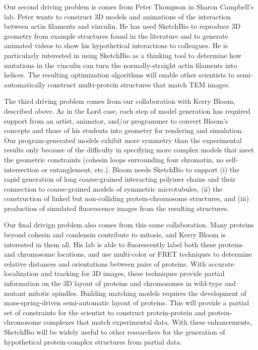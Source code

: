 \documentclass[twocolumn]{bmcart}%
\begin{document}
Our second driving problem is comes from Peter Thompson in Sharon Campbell's lab.  Peter wants to construct 3D models and animations of the interaction between actin filaments and vinculin.  He has used SketchBio to reproduce 3D geometry from example structures found in the literature and to generate animated videos to show his hypothetical interactions to colleagues.  He is particularly interested in using SketchBio as a thinking tool to determine how mutations in the vinculin can turn the normally-straight actin filaments into helices.  The resulting optimization algorithms will enable other scientists to semi-automatically construct multi-protein structures that match TEM images.

The third driving problem comes from our collaboration with Kerry Bloom, described above.  As in the Lord case, each step of model generation has required support from an artist, animator, and/or programmer to convert Bloom's concepts and those of his students into geometry for rendering and simulation.  Our program-generated models exhibit more symmetry than the experimental results only because of the difficulty in specifying more complex models that meet the geometric constraints (cohesin loops surrounding four chromatin, no self-intersection or entanglement, etc.).  Bloom needs SketchBio to support (i) the rapid generation of long coarse-grained interacting polymer chains and their connection to coarse-grained models of symmetric microtubules, (ii) the construction of linked but non-colliding protein-chromosome structures, and (iii) production of simulated fluorescence images from the resulting structures.

Our final drivign problem also comes from this same collaboration.  Many proteins beyond cohesin and condensin contribute to mitosis, and Kerry Bloom is interested in them all.  His lab is able to fluorescently label both these proteins and chromosome locations, and use multi-color or FRET techniques to determine relative distances and orientations between pairs of proteins.  With accurate localization and tracking for 3D images, these techniques provide partial information on the 3D layout of proteins and chromosomes in wild-type and mutant mitotic spindles.  Building matching models requires the development of mass-spring-driven semi-automatic layout of proteins.  This will provide a partial set of constraints for the scientist to construct protein-protein and protein-chromosome complexes that match experimental data.  With these enhancements, SketchBio will be widely useful to other researchers for the generation of hypothetical protein-complex structures from partial data.
\end{document}
